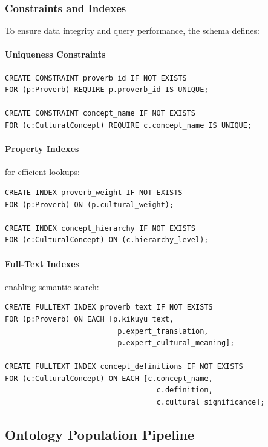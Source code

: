 \subsubsection{Constraints and Indexes}
\label{subsubsec:constraints_indexes}

To ensure data integrity and query performance, the schema defines:

\paragraph{Uniqueness Constraints}
\begin{verbatim}
CREATE CONSTRAINT proverb_id IF NOT EXISTS
FOR (p:Proverb) REQUIRE p.proverb_id IS UNIQUE;

CREATE CONSTRAINT concept_name IF NOT EXISTS
FOR (c:CulturalConcept) REQUIRE c.concept_name IS UNIQUE;
\end{verbatim}

\paragraph{Property Indexes} for efficient lookups:
\begin{verbatim}
CREATE INDEX proverb_weight IF NOT EXISTS
FOR (p:Proverb) ON (p.cultural_weight);

CREATE INDEX concept_hierarchy IF NOT EXISTS
FOR (c:CulturalConcept) ON (c.hierarchy_level);
\end{verbatim}

\paragraph{Full-Text Indexes} enabling semantic search:
\begin{verbatim}
CREATE FULLTEXT INDEX proverb_text IF NOT EXISTS
FOR (p:Proverb) ON EACH [p.kikuyu_text, 
                          p.expert_translation,
                          p.expert_cultural_meaning];

CREATE FULLTEXT INDEX concept_definitions IF NOT EXISTS
FOR (c:CulturalConcept) ON EACH [c.concept_name,
                                   c.definition,
                                   c.cultural_significance];
\end{verbatim}

\subsection{Ontology Population Pipeline}
\label{subsec:ontology_population}

